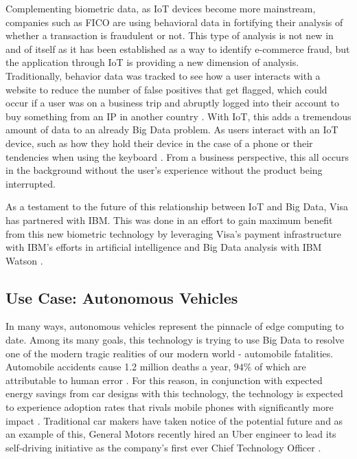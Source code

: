 \documentclass[sigconf]{acmart}
\begin{document}
Complementing biometric data, as IoT devices become more mainstream, companies such as FICO are using behavioral data in fortifying their analysis of whether a transaction is fraudulent or not. This type of analysis is not new in and of itself as it has been established as a way to identify e-commerce fraud, but the application through IoT is providing a new dimension of analysis. Traditionally, behavior data was tracked to see how a user interacts with a website to reduce the number of false positives that get flagged, which could occur if a user was on a business trip and abruptly logged into their account to buy something from an IP in another country \cite{fico}. With IoT, this adds a tremendous amount of data to an already Big Data problem. As users interact with an IoT device, such as how they hold their device in the case of a phone or their tendencies when using the keyboard \cite{biometricuses}. From a business perspective, this all occurs in the background without the user's experience without the product being interrupted. 

As a testament to the future of this relationship between IoT and Big Data, Visa has partnered with IBM. This was done in an effort to gain maximum benefit from this new biometric technology by leveraging Visa's payment infrastructure with IBM's efforts in artificial intelligence and Big Data analysis with IBM Watson \cite{ibmvisa}.

\subsection{Use Case: Autonomous Vehicles}

In many ways, autonomous vehicles represent the pinnacle of edge computing to date. Among its many goals, this technology is trying to use Big Data to resolve one of the modern tragic realities of our modern world - automobile fatalities.  Automobile accidents cause 1.2 million deaths a year, $94\%$ of which are attributable to human error \cite{fatalities}. For this reason, in conjunction with expected energy savings from car designs with this technology, the technology is expected to experience adoption rates that rivals mobile phones with significantly more impact \cite{autonomousimpact}. Traditional car makers have taken notice of the potential future and as an example of this, General Motors recently hired an Uber engineer to lead its self-driving initiative as the company's first ever Chief Technology Officer \cite{gmcto}.
\end{document}
